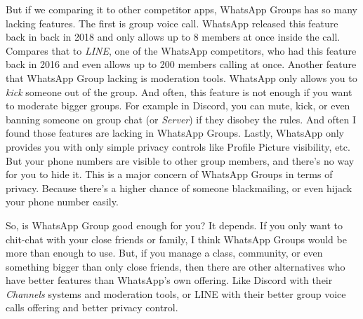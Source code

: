 \documentclass[
  12pt,
  answers  
]{exam}
\begin{document}
    But if we comparing it to other competitor apps, WhatsApp Groups has so many lacking features. The first is group voice call. WhatsApp released this feature back in back in 2018 and only allows up to 8 members at once inside the call. Compares that to \emph{LINE}, one of the WhatsApp competitors, who had this feature back in 2016 and even allows up to 200 members calling at once. Another feature that WhatsApp Group lacking is moderation tools. WhatsApp only allows you to \emph{kick} someone out of the group. And often, this feature is not enough if you want to moderate bigger groups. For example in Discord, you can mute, kick, or even banning someone on group chat (or \emph{Server}) if they disobey the rules. And often I found those features are lacking in WhatsApp Groups. Lastly, WhatsApp only provides you with only simple privacy controls like Profile Picture visibility, etc. But your phone numbers are visible to other group members, and there's no way for you to hide it. This is a major concern of WhatsApp Groups in terms of privacy. Because there's a higher chance of someone blackmailing, or even hijack your phone number easily. 

    So, is WhatsApp Group good enough for you? It depends. If you only want to chit-chat with your close friends or family, I think WhatsApp Groups would be more than enough to use. But, if you manage a class, community, or even something bigger than only close friends, then there are other alternatives who have better features than WhatsApp's own offering. Like Discord with their \emph{Channels} systems and moderation tools, or LINE with their better group voice calls offering and better privacy control.
    \pagebreak
    \printbibliography
		
\end{document}
